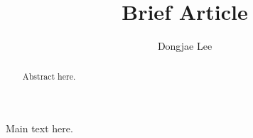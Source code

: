 \documentclass[11pt, oneside]{article}   	%
\title{Brief Article}
\author{Dongjae Lee}
\date{}
\begin{document}
\maketitle


\begin{abstract}
  Abstract here.
\end{abstract}

Main text here.
\end{document}
